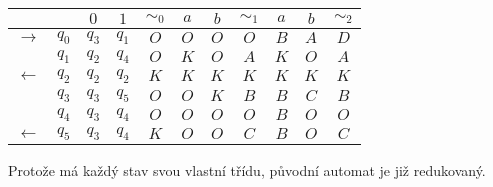 \begin{center}
    \begin{tabular}{|r r|c c||c|c c||c|c c||c|}
        \hline
        &  & $0$ & $1$ & $ \sim_0 $ & $a$ & $b$ & $\sim_1$ & $a$ & $b$ & $\sim_2$\\ \hline \hline
        $\to$  & $q_0$ & $q_3$ & $q_1$ & $O$ & $O$ & $O$ & $O$ & $B$ & $A$ & $D$ \\
               & $q_1$ & $q_2$ & $q_4$ & $O$ & $K$ & $O$ & $A$ & $K$ & $O$ & $A$ \\
        $\gets$& $q_2$ & $q_2$ & $q_2$ & $K$ & $K$ & $K$ & $K$ & $K$ & $K$ & $K$ \\
               & $q_3$ & $q_3$ & $q_5$ & $O$ & $O$ & $K$ & $B$ & $B$ & $C$ & $B$ \\
               & $q_4$ & $q_3$ & $q_4$ & $O$ & $O$ & $O$ & $O$ & $B$ & $O$ & $O$ \\
        $\gets$& $q_5$ & $q_3$ & $q_4$ & $K$ & $O$ & $O$ & $C$ & $B$ & $O$ & $C$ \\
        \hline
    \end{tabular}
\end{center}

Protože má každý stav svou vlastní třídu, původní automat je již redukovaný.
